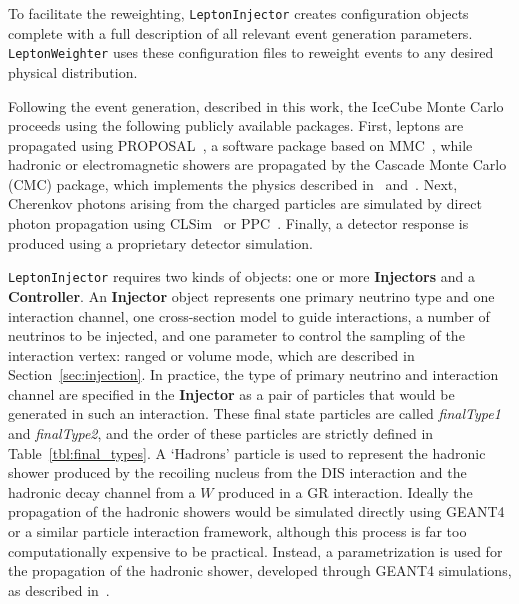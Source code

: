 \documentclass[main.tex]{subfiles}
\newcommand{\LeptonInjector}{\texttt{LeptonInjector}}
\newcommand{\LeptonWeighter}{\texttt{LeptonWeighter}}
\begin{document}
To facilitate the reweighting, \LeptonInjector{} creates configuration objects complete with a full description of all relevant event generation parameters.
\LeptonWeighter{} uses these configuration files to reweight events to any desired physical distribution. 

Following the event generation, described in this work, the IceCube Monte Carlo proceeds using the following publicly available packages.
First, leptons are propagated using {\ttf PROPOSAL}~\cite{Koehne:2013gpa}, a software package based on {\ttf MMC}~\cite{Chirkin:2004hz}, while hadronic or electromagnetic showers are propagated by the {\ttf Cascade Monte Carlo} (CMC) package, which implements the physics described in~\cite{Niess_2006} and~\cite{Wiebusch:thesis,2012APh....38...53R,Radel:2012ij}.
Next, Cherenkov photons arising from the charged particles are simulated by direct photon propagation using {\ttf CLSim}~\cite{9041727,CLSim} or {\ttf PPC}~\cite{Chirkin:2015kga,PPCStandAlone}.
Finally, a detector response is produced using a proprietary detector simulation.

\LeptonInjector{} requires two kinds of objects: one or more \textbf{Injectors} and a \textbf{Controller}.
An \textbf{Injector} object represents one primary neutrino type and one interaction channel, one cross-section model to guide interactions, a number of neutrinos to be injected, and one parameter to control the sampling of the interaction vertex: ranged or volume mode, which are described in Section~\ref{sec:injection}. 
In practice, the type of primary neutrino and interaction channel are specified in the \textbf{Injector} as a pair of particles that would be generated in such an interaction. 
These final state particles are called \textit{finalType1} and \textit{finalType2}, and the order of these particles are strictly defined in Table~\ref{tbl:final_types}. 
A `Hadrons' particle is used to represent the hadronic shower produced by the recoiling nucleus from the DIS interaction and the hadronic decay channel from a $W$ produced in a GR interaction. 
Ideally the propagation of the hadronic showers would be simulated directly using GEANT4 or a similar particle interaction framework, although this process is far too computationally expensive to be practical. 
Instead, a parametrization is used for the propagation of the hadronic shower, developed through GEANT4 simulations, as described in~\cite{Wiebusch:thesis}.
\end{document}
